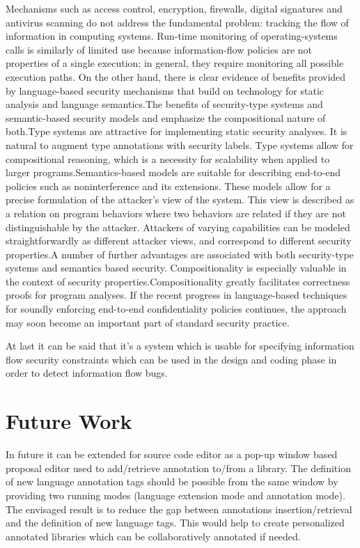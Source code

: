Mechanisms such as access control, encryption, firewalls, digital
signatures and antivirus scanning do not address the fundamental
problem: tracking the flow of information in computing
systems. Run-time monitoring of operating-systems calls is
similarly of limited use because information-flow policies are
not properties of a single execution; in general, they require
monitoring all possible execution paths. On the other hand,
there is clear evidence of benefits provided by language-based
security mechanisms that build on technology for static analysis
and language semantics.The benefits of security-type systems and semantic-based security models and emphasize the compositional nature of both.Type systems are attractive for
implementing static security analyses. It is natural to augment
type annotations with security labels. Type systems allow for
compositional reasoning, which is a necessity for scalability
when applied to larger programs.Semantics-based models
are suitable for describing end-to-end policies such as
noninterference and its extensions. These models allow for a
precise formulation of the attacker's view of the system. This
view is described as a relation on program behaviors where
two behaviors are related if they are not distinguishable by
the attacker. Attackers of varying capabilities can be modeled
straightforwardly as different attacker views, and correspond
to different security properties.A number of further advantages are
associated with both security-type systems and semantics based
security. Compositionality is especially valuable in the
context of security properties.Compositionality
greatly facilitates correctness proofs for program analyses. If the recent
progress in language-based techniques for soundly enforcing
end-to-end confidentiality policies continues, the approach
may soon become an important part of standard security
practice.

At last it can be said that it's a system which is usable for specifying information flow security constraints which can be used in the design and coding phase in order to detect information flow bugs.





\section{ Future Work}
In future it can be extended for source code editor as
a pop-up window based proposal editor used to add/retrieve
annotation to/from a library. The definition of new language
annotation tags should be possible from the same window by
providing two running modes (language extension mode and
annotation mode). The envisaged result is to reduce the gap
between annotations insertion/retrieval and the definition of
new language tags. This would help to create personalized
annotated libraries which can be collaboratively annotated if
needed.

